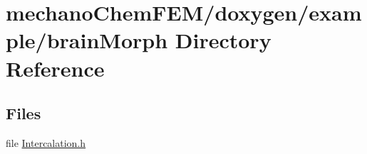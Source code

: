 \section{mechano\+Chem\+F\+E\+M/doxygen/example/brain\+Morph Directory Reference}
\label{dir_051c84d89afcd9a1c0e44317f1015452}
\subsection*{Files}
\begin{DoxyCompactItemize}
\item 
file \mbox{\hyperlink{_intercalation_8h}{Intercalation.\+h}}
\end{DoxyCompactItemize}
